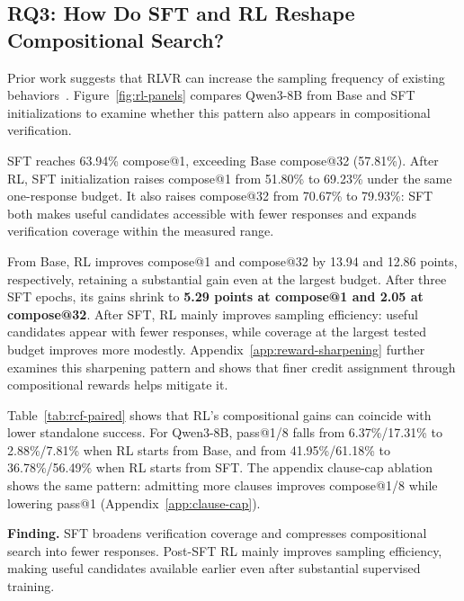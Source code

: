 \subsection{RQ3: How Do SFT and RL Reshape Compositional Search?}
\label{sec:exp:rl}

Prior work suggests that RLVR can increase the sampling frequency of existing
behaviors~\citep{yue2025rlcapacity}.
Figure~\ref{fig:rl-panels} compares Qwen3-8B from Base and SFT initializations
to examine whether this pattern also appears in compositional verification.

SFT reaches 63.94\% compose@1, exceeding Base compose@32 (57.81\%).
After RL, SFT initialization raises compose@1 from 51.80\% to 69.23\%
under the same one-response budget.
It also raises compose@32 from 70.67\% to 79.93\%: SFT both makes
useful candidates accessible with fewer responses and expands verification
coverage within the measured range.

From Base, RL improves compose@1 and compose@32 by 13.94 and 12.86
points, respectively, retaining a substantial gain even at the largest budget.
After three SFT epochs, its gains shrink to \textbf{5.29 points at compose@1
and 2.05 at compose@32}. After SFT, RL mainly improves sampling
efficiency: useful candidates appear with fewer responses, while
coverage at the largest tested budget improves more modestly.
Appendix~\ref{app:reward-sharpening} further examines this sharpening pattern
and shows that finer credit assignment through compositional rewards helps
mitigate it.

Table~\ref{tab:rcf-paired} shows that RL's compositional gains can coincide
with lower standalone success.  For Qwen3-8B, pass@1/8 falls from
6.37\%/17.31\% to 2.88\%/7.81\% when RL starts from Base, and from
41.95\%/61.18\% to 36.78\%/56.49\% when RL starts from SFT.  The appendix
clause-cap ablation shows the same pattern: admitting more clauses improves
compose@1/8 while lowering pass@1 (Appendix~\ref{app:clause-cap}).

\begin{insightbox}
\textbf{Finding.}
SFT broadens verification coverage and compresses compositional search into
fewer responses.  Post-SFT RL mainly improves sampling efficiency, making
useful candidates available earlier even after substantial supervised training.
\end{insightbox}

